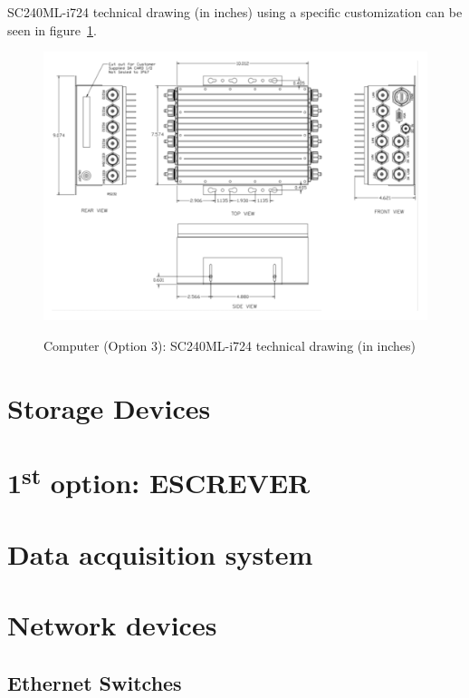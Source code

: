 SC240ML-i724 technical drawing (in inches) using a specific customization can be seen in figure~\ref{FIG:DEVICEPCOPTION3DRAWING}.
\begin{figure}
  \centering
  \includegraphics[angle=90,width=1\columnwidth]{figs/body02/FIGDEVICEPCOPTION3DRAWING.pdf}\\
  \caption[Computer (Option 3): SC240ML-i724 technical drawing (in inches)]{Computer (Option 3): SC240ML-i724 technical drawing (in inches)}
  \label{FIG:DEVICEPCOPTION3DRAWING}
\end{figure}

\section{Storage Devices} \label{DEVICE:STORAGE}
\section{1\textsuperscript{st} option: ESCREVER}

\section{Data acquisition system}

\section{Network devices} \label{DEVICE:NETWORK}
\subsection{Ethernet Switches}  \label{DEVICE:ETHERNETSWITCHES}
